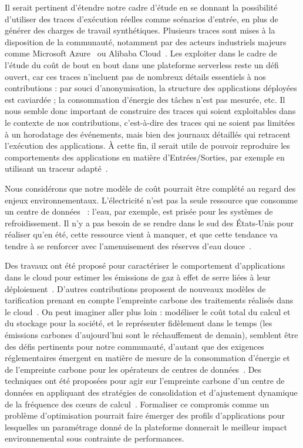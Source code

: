 Il serait pertinent d'étendre notre cadre d'étude en se donnant la possibilité d'utiliser des traces d'exécution réelles comme scénarios d'entrée, en plus de générer des charges de travail synthétiques. Plusieurs traces sont mises à la disposition de la communauté, notamment par des acteurs industriels majeurs comme Microsoft Azure~\cite{cortezResourceCentralUnderstanding2017a} ou Alibaba Cloud~\cite{mahmoudiSimFaaSPerformanceSimulator2021}. Les exploiter dans le cadre de l'étude du coût de bout en bout dans une plateforme serverless reste un défi ouvert, car ces traces n'incluent pas de nombreux détails essentiels à nos contributions : par souci d'anonymisation, la structure des applications déployées est caviardée ; la consommation d'énergie des tâches n'est pas mesurée, etc. Il nous semble donc important de construire des traces qui soient exploitables dans le contexte de nos contributions, c'est-à-dire des traces qui ne soient pas limitées à un horodatage des événements, mais bien des journaux détaillés qui retracent l'exécution des applications. À cette fin, il serait utile de pouvoir reproduire les comportements des applications en matière d'Entrées/Sorties, par exemple en utilisant un traceur adapté~\cite{naasEZIOTracerUnifyingKernel2021, ouarnoughiMultilevelTracerTiming}.

Nous considérons que notre modèle de coût pourrait être complété au regard des enjeux environnementaux. L'électricité n'est pas la seule ressource que consomme un centre de données~\cite{rickeCountrylevelSocialCost2018} : l'eau, par exemple, est prisée pour les systèmes de refroidissement. Il n'y a pas besoin de se rendre dans le sud des États-Unis pour réaliser qu'en été, cette ressource vient à manquer, et que cette tendance va tendre à se renforcer avec l'amenuisement des réserves d'eau douce~\cite{EauAvecRessource2024}.

Des travaux ont été proposé pour caractériser le comportement d'applications dans le cloud pour estimer les émissions de gaz à effet de serre liées à leur déploiement~\cite{courageux-sudanStudyingEndendPerformancea}. D'autres contributions proposent de nouveaux modèles de tarification prenant en compte l'empreinte carbone des traitements réalisés dans le cloud~\cite{linBridgingSustainabilityGap2024}. On peut imaginer aller plus loin : modéliser le coût total du calcul et du stockage pour la société, et le représenter fidèlement dans le temps (les émissions carbones d'aujourd'hui sont le réchauffement de demain), semblent être des défis pertinents pour notre communauté, d'autant que des exigences réglementaires émergent en matière de mesure de la consommation d'énergie et de l'empreinte carbone pour les opérateurs de centres de données~\cite{davisUptimeInstituteGlobal2022}. Des techniques ont été proposées pour agir sur l'empreinte carbone d'un centre de données en appliquant des stratégies de consolidation et d'ajustement dynamique de la fréquence des cœurs de calcul~\cite{ostapencoModelingEvaluatingOrchestrating2023}. Formaliser ce compromis comme un problème d'optimisation pourrait faire émerger des profils d'applications pour lesquelles un paramétrage donné de la plateforme donnerait le meilleur impact environnemental sous contrainte de performances.

